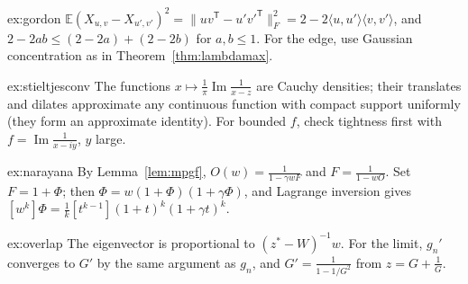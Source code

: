 \begin{hint}{ex:gordon}
$\mathbb E(X_{u,v}-X_{u',v'})^2=\|uv^{\mathsf T}-u'v'^{\mathsf T}\|_F^2=2-2\langle u,u'\rangle\langle v,v'\rangle$, and $2-2ab\le(2-2a)+(2-2b)$ for $a,b\le1$. For the edge, use Gaussian concentration as in Theorem~\ref{thm:lambdamax}.
\end{hint}

\begin{hint}{ex:stieltjesconv}
The functions $x\mapsto\frac1\pi\operatorname{Im}\frac1{x-z}$ are Cauchy densities; their translates and dilates approximate any continuous function with compact support uniformly (they form an approximate identity). For bounded
$f$, check tightness first with $f=\operatorname{Im}\frac1{x-iy}$, $y$ large.
\end{hint}

\begin{hint}{ex:narayana}
By Lemma~\ref{lem:mpgf}, $O(w)=\frac1{1-\gamma wF}$ and $F=\frac1{1-wO}$. Set $F=1+\Phi$; then $\Phi=w(1+\Phi)(1+\gamma\Phi)$, and Lagrange inversion gives $[w^k]\Phi=\frac1k[t^{k-1}](1+t)^k(1+\gamma t)^k$.
\end{hint}

\begin{hint}{ex:overlap}
The eigenvector is proportional to $(z^*-W)^{-1}w$. For the limit, $g_n'$ converges to $G'$ by the same argument as $g_n$, and $G'=\frac1{1-1/G^2}$ from $z=G+\frac1G$.
\end{hint}

